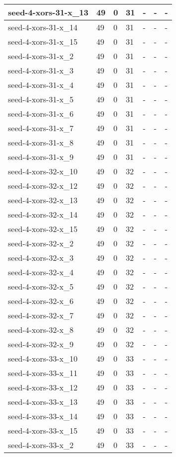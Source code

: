 \begin{scriptsize}
\begin{longtable}{|p{5cm}|l|l|l|l|l|l|}
seed-4-xors-31-x\_13&49&0&31&-&-&- \\ \hline 
seed-4-xors-31-x\_14&49&0&31&-&-&- \\ \hline 
seed-4-xors-31-x\_15&49&0&31&-&-&- \\ \hline 
seed-4-xors-31-x\_2&49&0&31&-&-&- \\ \hline 
seed-4-xors-31-x\_3&49&0&31&-&-&- \\ \hline 
seed-4-xors-31-x\_4&49&0&31&-&-&- \\ \hline 
seed-4-xors-31-x\_5&49&0&31&-&-&- \\ \hline 
seed-4-xors-31-x\_6&49&0&31&-&-&- \\ \hline 
seed-4-xors-31-x\_7&49&0&31&-&-&- \\ \hline 
seed-4-xors-31-x\_8&49&0&31&-&-&- \\ \hline 
seed-4-xors-31-x\_9&49&0&31&-&-&- \\ \hline 
seed-4-xors-32-x\_10&49&0&32&-&-&- \\ \hline 
seed-4-xors-32-x\_12&49&0&32&-&-&- \\ \hline 
seed-4-xors-32-x\_13&49&0&32&-&-&- \\ \hline 
seed-4-xors-32-x\_14&49&0&32&-&-&- \\ \hline 
seed-4-xors-32-x\_15&49&0&32&-&-&- \\ \hline 
seed-4-xors-32-x\_2&49&0&32&-&-&- \\ \hline 
seed-4-xors-32-x\_3&49&0&32&-&-&- \\ \hline 
seed-4-xors-32-x\_4&49&0&32&-&-&- \\ \hline 
seed-4-xors-32-x\_5&49&0&32&-&-&- \\ \hline 
seed-4-xors-32-x\_6&49&0&32&-&-&- \\ \hline 
seed-4-xors-32-x\_7&49&0&32&-&-&- \\ \hline 
seed-4-xors-32-x\_8&49&0&32&-&-&- \\ \hline 
seed-4-xors-32-x\_9&49&0&32&-&-&- \\ \hline 
seed-4-xors-33-x\_10&49&0&33&-&-&- \\ \hline 
seed-4-xors-33-x\_11&49&0&33&-&-&- \\ \hline 
seed-4-xors-33-x\_12&49&0&33&-&-&- \\ \hline 
seed-4-xors-33-x\_13&49&0&33&-&-&- \\ \hline 
seed-4-xors-33-x\_14&49&0&33&-&-&- \\ \hline 
seed-4-xors-33-x\_15&49&0&33&-&-&- \\ \hline 
seed-4-xors-33-x\_2&49&0&33&-&-&- \\ \hline 

\end{longtable}
\end{scriptsize}
